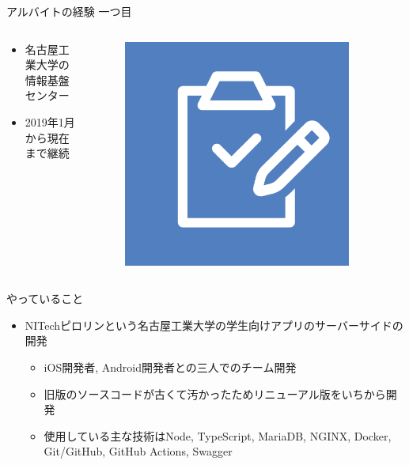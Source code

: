 \documentclass[12pt, unicode]{beamer}
\begin{document}
\begin{frame}{アルバイトの経験 一つ目}
  \begin{columns}
    \begin{column}{0.8\textwidth}
      \begin{itemize}
        \item 名古屋工業大学の情報基盤センター
        \item 2019年1月から現在まで継続
      \end{itemize}
    \end{column}

    \begin{column}{0.2\textwidth}
      \begin{figure}[h]
        \centering
        \includegraphics[width=0.9\textwidth]{pictures/Pyrroline.png}
      \end{figure}
    \end{column}
  \end{columns}

  \begin{block}{やっていること}
    \begin{itemize}
      \item NITechピロリンという名古屋工業大学の学生向けアプリのサーバーサイドの開発
      \begin{itemize}
        \item iOS開発者, Android開発者との三人でのチーム開発
        \item 旧版のソースコードが古くて汚かったためリニューアル版をいちから開発
        \item 使用している主な技術はNode, TypeScript, MariaDB, NGINX, Docker, Git/GitHub, GitHub Actions, Swagger
      \end{itemize}
    \end{itemize}
  \end{block}
\end{frame}
\end{document}
